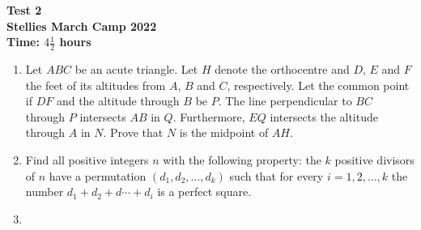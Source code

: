 \documentclass{article}
\begin{document}
\thispagestyle{empty}

\begin{center}
  \textbf{\Large Test 2}
  \\ \vspace{1em}
  \textbf{\large Stellies March Camp 2022}
  \\ \vspace{1em}
  \textbf{\large Time: $4\frac{1}{2}$ hours}
\end{center}

\vspace{24pt}

\begin{enumerate}

\item %
Let $ABC$ be an acute triangle.
Let $H$ denote the orthocentre and $D$, $E$ and $F$ the feet of its altitudes from $A$, $B$ and $C$, respectively.
Let the common point if $DF$ and the altitude through $B$ be $P$.
The line perpendicular to $BC$ through $P$ intersects $AB$ in $Q$.
Furthermore, $EQ$ intersects the altitude through $A$ in $N$.
Prove that $N$ is the midpoint of $AH$.

\item %
Find all positive integers $n$ with the following property:
the $k$ positive divisors of $n$ have a permutation $(d_1, d_2, \dotsc, d_k)$ such that for every $i = 1, 2, \dotsc, k$ the number $d_1 +d_2 +d\dotsb +d_i$ is a perfect square.

\item %


\end{enumerate}

\vfill
\centering
\begin{BVerbatim}
\end{BVerbatim}
\end{document}
